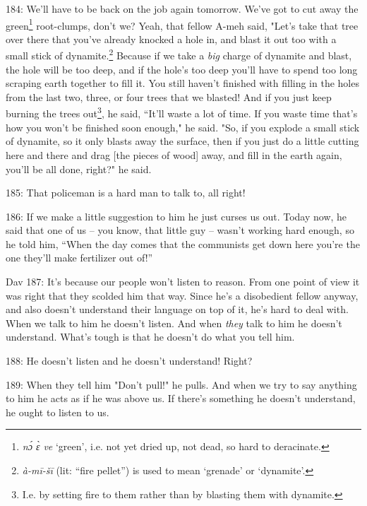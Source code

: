 184: We'll have to be back on the job again tomorrow. We've got to cut away the
green\footnote{\textit{nɔ́ ɛ̀ ve} `green', i.e. not yet dried up, not dead, so hard to deracinate.} root-clumps, don't we? Yeah, that fellow A-meh said, "Let's
take that tree over there that you've already knocked a hole in, and blast it out
too with a small stick of dynamite.\footnote{\textit{à-mī-šī } (lit: ``fire pellet'') is used to mean `grenade' or `dynamite'.} Because if we take a \textit{big} charge
of dynamite and blast, the hole will be too deep, and if the hole's too deep you'll
have to spend too long scraping earth together to fill it. You still haven't finished
with filling in the holes from the last two, three, or four trees that we blasted!
And if you just keep burning the trees out\footnote{I.e. by setting fire to them rather than by blasting them with dynamite.}, he said, ``It'll waste a lot of
time. If you waste time that's how you won't be finished soon enough,"
he said. "So, if you explode a small stick of dynamite, so it only blasts
away the surface, then if you just do a little cutting here and there and drag
[the pieces of wood] away, and fill in the earth again, you'll be all done, right?"
he said.

185: That policeman is a hard man to talk to, all right!

186: If we make a little suggestion to him he just curses us out. Today now, he
said that one of us -- you know, that little guy -- wasn't working hard enough,
so he told him, ``When the day comes that the communists get down here you're the
one they'll make fertilizer out of!''

Dav 187: It's because our people won't listen to reason. From one point of view
it was right that they scolded him that way. Since he's a disobedient fellow anyway,
and also doesn't understand their language on top of it, he's hard to deal with.
When we talk to him he doesn't listen. And when \textit{they} talk to him he doesn't
understand. What's tough is that he doesn't do what you tell him.

188: He doesn't listen and he doesn't understand! Right?

189: When they tell him "Don't pull!" he pulls. And when we try
to say anything to him he acts as if he was above us. If there's something he doesn't
understand, he ought to listen to us.

